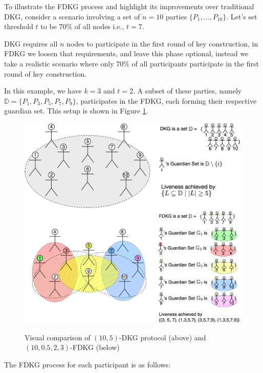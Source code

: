 \documentclass[lettersize,journal]{IEEEtran}
\theoremstyle{definition}
\begin{document}
To illustrate the FDKG process and highlight its improvements over traditional DKG, consider a scenario involving a set of $n=10$ parties $\{P_1, \ldots, P_{10}\}$. Let's set threshold $t$ to be 70\% of all nodes i.e., $t=7$.

DKG requires all $n$ nodes to participate in the first round of key construction, in FDKG we loosen that requirements, and leave this phase optional, instead we take a realistic scenario where only 70\% of all participants participate in the first round of key construction.

In this example, we have $k = 3$ and $t = 2$. A subset of these parties, namely $\mathbb{D} = \{P_1, P_3, P_5, P_7, P_9\}$, participates in the FDKG, each forming their respective guardian set. This setup is shown in Figure \ref{fig:FDKG}.

\begin{figure}
    \centering
    \includegraphics[width=.5\textwidth]{DKG-example.png} \\
    \vspace{0.5em} 
    \includegraphics[width=.5\textwidth]{FDKG-example.png}
    \caption{Visual comparison of $(10,5)$-DKG protocol (above) and $(10, 0.5, 2, 3)$-FDKG (below)}
    \label{fig:FDKG}
\end{figure}

The FDKG process for each participant is as follows:
\end{document}
